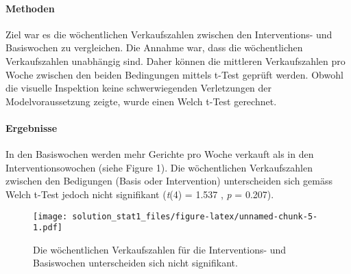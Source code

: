 \documentclass[]{article}
\let\oldparagraph\paragraph
\renewcommand{\paragraph}[1]{\oldparagraph{#1}\mbox{}}
\begin{document}
\hypertarget{methoden-1}{%
\paragraph{Methoden}\label{methoden-1}}

Ziel war es die wöchentlichen Verkaufszahlen zwischen den Interventions-
und Basiswochen zu vergleichen. Die Annahme war, dass die wöchentlichen
Verkaufszahlen unabhängig sind. Daher können die mittleren
Verkaufszahlen pro Woche zwischen den beiden Bedingungen mittels t-Test
geprüft werden. Obwohl die visuelle Inspektion keine schwerwiegenden
Verletzungen der Modelvoraussetzung zeigte, wurde einen Welch t-Test
gerechnet.

\hypertarget{ergebnisse-1}{%
\paragraph{Ergebnisse}\label{ergebnisse-1}}

In den Basiswochen werden mehr Gerichte pro Woche verkauft als in den
Interventionsowochen (siehe Figure 1). Die wöchentlichen Verkaufszahlen
zwischen den Bedigungen (Basis oder Intervention) unterscheiden sich
gemäss Welch t-Test jedoch nicht signifikant (\emph{t}(4) = 1.537 ,
\emph{p} = 0.207).

\begin{figure}
\centering
\texttt{[image: solution\_stat1\_files/figure-latex/unnamed-chunk-5-1.pdf]}
\caption{Die wöchentlichen Verkaufszahlen für die Interventions- und
Basiswochen unterscheiden sich nicht signifikant.}
\end{figure}
\end{document}
